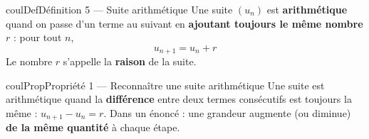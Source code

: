\documentclass[11pt,a4paper]{article}
\makeatletter
\newcounter{lycee@signet}
\newcommand{\signet}[3][]{\stepcounter{lycee@signet}%
  \edef\lycee@dest{\if\relax\detokenize{#1}\relax
    signet.\arabic{lycee@signet}\else#1\fi}%
  \hypertarget{\lycee@dest}{}\bookmark[level=#2,dest=\lycee@dest]{#3}}
\newenvironment{definitionbox}[1][Définition]%
  {\begin{boitecours}[phantom={\signet{2}{#1}}]{coulDef}{#1}}{\end{boitecours}}
\newenvironment{proprietebox}[1][Propriété]%
  {\begin{boitecours}[phantom={\signet{2}{#1}}]{coulProp}{#1}}{\end{boitecours}}
\makeatother
\begin{document}
\begin{definitionbox}[Définition 5 --- Suite arithmétique]
Une suite $(u_{n})$ est \textbf{arithmétique} quand on passe d'un terme au suivant en
\textbf{ajoutant toujours le même nombre} $r$ : pour tout $n$,
\[
  \boxed{u_{n+1}=u_{n}+r}
\]
Le nombre $r$ s'appelle la \textbf{raison} de la suite.
\end{definitionbox}

\begin{proprietebox}[Propriété 1 --- Reconnaître une suite arithmétique]
Une suite est arithmétique quand la \textbf{différence} entre deux termes consécutifs
est toujours la même : $u_{n+1}-u_{n}=r$. Dans un énoncé : une grandeur augmente (ou
diminue) \textbf{de la même quantité} à chaque étape.
\end{proprietebox}
\end{document}
